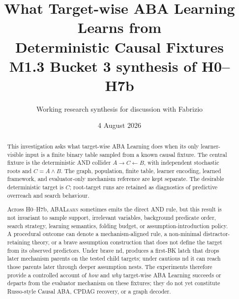 \documentclass[11pt]{article}
\title{What Target-wise ABA Learning Learns from\\
Deterministic Causal Fixtures\\[0.35em]
\large M1.3 Bucket 3 synthesis of H0--H7b}
\author{Working research synthesis for discussion with Fabrizio}
\date{4 August 2026}
\DeclareRobustCommand{\code}[1]{\texttt{\detokenize{#1}}}
\newcommand{\ABALearn}{\textsc{ABALearn}}
\begin{document}
\maketitle

\begin{center}
\end{center}

\begin{abstract}
This investigation asks what target-wise ABA Learning does when its only
learner-visible input is a finite binary table sampled from a known causal
fixture. The central fixture is the deterministic AND collider
\(A\rightarrow C\leftarrow B\), with independent stochastic roots and
\(C=A\land B\). The graph, population, finite table, learner encoding, learned
framework, and evaluator-only mechanism reference are kept separate. The
desirable deterministic target is \(C\); root-target runs are retained as
diagnostics of predictive overreach and search behaviour.

Across H0--H7b, \ABALearn{} sometimes emits the direct AND rule, but this
result is not invariant to sample support, irrelevant variables, background
predicate order, search strategy, learning semantics, folding budget, or
assumption-introduction policy. A procedural \code{solved} outcome can denote
a mechanism-aligned rule, a non-minimal distractor-retaining theory, or a brave
assumption construction that does not define the target from its observed
predictors. Under brave nd, \code{sechk} produces a first-BK latch that drops
later mechanism parents on the tested child targets; under cautious nd it can
reach those parents later through deeper assumption nests. The experiments
therefore provide a controlled account of
\emph{how} and \emph{why} target-wise ABA Learning succeeds or departs from
the evaluator mechanism on these fixtures; they do not yet constitute
Russo-style Causal ABA, CPDAG recovery, or a graph decoder.
\end{abstract}
\end{document}
